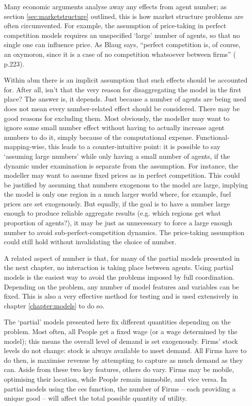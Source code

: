 {Many economic arguments analyse away any effects from agent number; as section \ref{sec:marketstructure} outlined, this is how market structure problems are often circumvented. For example, the assumption of price-taking in perfect competition models requires an unspecified `large' number of agents, so that no single one can influence price. As Blaug says, ``perfect competition is, of course, an oxymoron, since it is a case of no competition whatsoever between firms'' (\citealt{blaug_trade-off_2009} p.223).

Within \gls{abm} there is an implicit assumption that such effects should be accounted for. After all, isn't that the very reason for disaggregating the model in the first place? The answer is, it depends. Just because a number of agents are being used does not mean every number-related effect should be considered. There may be good reasons for excluding them. Most obviously, the modeller may want to ignore some small number effect without having to actually increase agent numbers to do it, simply because of the computational expense. Functional-mapping-wise, this leads to a counter-intuitive point: it is possible to say `assuming large numbers' while only having a small number of agents, if the dynamic under examination is separate from the assumption. For instance, the modeller may want to assume fixed prices as in perfect competition. This could be justified by assuming that numbers exogenous to the model are large, implying the model is only one region in a much larger world where, for example, fuel prices are set exogenously. But equally, if the goal is to have a number large enough to produce reliable aggregate results (e.g. which regions get what proportion of agents?), it may be just as unnecessary to force a large enough number to avoid sub-perfect-competition dynamics. The price-taking assumption could still hold without invalidating the choice of number.

A related aspect of number is that, for many of the partial models presented in the next chapter, no interaction is taking place between agents. Using partial models is the easiest way to avoid the problems imposed by full coordination. Depending on the problem, any number of model features and variables can be fixed. This is also a very effective method for testing and is used extensively in chapter \ref{chapter:models} to do so. 

The `partial' models presented here fix different quantities depending on the problem. Most often, all People get a fixed wage (or a wage determined by the model); this means the overall level of demand is set exogenously. Firms' stock levels do not change: stock is always available to meet demand. All Firms have to do then, is maximise revenue by attempting to capture as much demand as they can. Aside from these two key features, others do vary. Firms may be mobile, optimising their location, while People remain immobile, and vice versa. In partial models using the \gls{ces} function, the number of Firms – each providing a unique good – will affect the total possible quantity of utility. 

}
